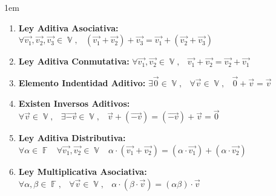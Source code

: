 \documentclass[12pt, fleqn]{report}                             %
\newenvironment{SmallIndentation}[1][0.75em]                    %
        {\begin{adjustwidth}{#1}{}\begin{footnotesize}}             %
        {\end{footnotesize}\end{adjustwidth}}                       %
\DeclareMathOperator \Space {\quad}                             %
\DeclareMathOperator \MiniSpace {\;}                            %
\theoremstyle{break}                                            %
\DeclareMathOperator \GenericField {\mathbb{F}}                 %
\DeclareMathOperator \VectorSet    {\mathbb{V}}                 %
\begin{document}
                \begin{SmallIndentation}[1em]

                    \begin{enumerate}
                    
                        \item 
                            \textbf{Ley Aditiva Asociativa:}
                            $\forall \vec{v_1}, \vec{v_2}, \vec{v_3} \in \VectorSet, \MiniSpace
                                (\vec{v_1} + \vec{v_2}) + \vec{v_3} = \vec{v_1} + (\vec{v_2} + \vec{v_3})$

                        \item 
                            \textbf{Ley Aditiva Conmutativa:}
                            $\forall \vec{v_1}, \vec{v_2} \in \VectorSet, \MiniSpace
                                    \vec{v_1} + \vec{v_2} = \vec{v_2} + \vec{v_1}$

                        \item 
                            \textbf{Elemento Indentidad Aditivo:}
                            $\exists \vec{0} \in \VectorSet, \MiniSpace
                                \forall \vec{v} \in \VectorSet, \MiniSpace \vec{0} + \vec{v} = \vec{v}$

                        \item 
                            \textbf{Existen Inversos Aditivos:}
                            $\forall \vec{v} \in \VectorSet, \MiniSpace
                                    \exists \vec{-v} \in \VectorSet, \MiniSpace
                                        \vec{v} + (\vec{-v}) = (\vec{-v}) + \vec{v} = \vec{0}$

                        \item 
                            \textbf{Ley Aditiva Distributiva:}
                            $\forall \alpha \in \GenericField \MiniSpace
                                \forall \vec{v_1}, \vec{v_2} \in \VectorSet \MiniSpace
                                    \alpha \cdot (\vec{v_1} + \vec{v_2}) = 
                                        (\alpha \cdot \vec{v_1}) + (\alpha \cdot \vec{v_2})$

                        \item 
                            \textbf{Ley Multiplicativa Asociativa:}
                            $\forall \alpha, \beta \in \GenericField, \MiniSpace
                                \forall \vec{v} \in \VectorSet, \MiniSpace
                                    \alpha \cdot (\beta \cdot \vec{v}) = (\alpha \beta) \cdot \vec{v}$


\end{enumerate}
\end{SmallIndentation}
\end{document}

